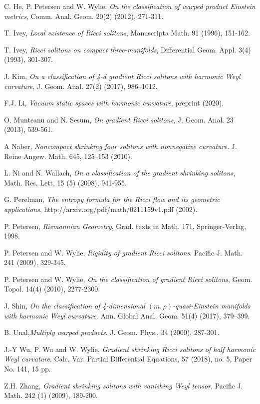 \documentclass{amsart}
\theoremstyle{definition}
\theoremstyle{remark}
\numberwithin{equation}{section}
\begin{document}
\begin{thebibliography}{30}
		 C. He, P. Petersen and W. Wylie, {\em On the classification of warped product Einstein metrics},
			Comm. Anal. Geom. 20(2) (2012), 271-311.
		
		 T. Ivey, {\em Local existence of Ricci solitons}, Manuscripta Math. 91 (1996), 151-162.
		
		 T. Ivey, {\em Ricci solitons on compact three-manifolds}, Differential Geom. Appl. 3(4) (1993), 301-307.
		
		 J. Kim, {\em On a classification of 4-d gradient Ricci solitons with harmonic Weyl curvature}, J. Geom. Anal. 27(2) (2017), 986–1012. 

        F.J. Li, {\em  Vacuum static spaces with harmonic curvature}, preprint (2020).

		 O. Munteanu and N. Sesum, {\em On gradient Ricci solitons}, J. Geom. Anal. 23 (2013), 539-561.

      A Naber, {\em Noncompact shrinking four solitons with nonnegative curvature}. J. Reine Angew. Math. 645, 125–153 (2010).  
		
		 L. Ni and N. Wallach, {\em On a classification of the gradient shrinking solitons}, Math. Res. Lett,
		15 (5) (2008), 941-955.
	
		 G. Perelman, {\em The entropy formula for the Ricci flow and its geometric applications}, http://arxiv.org/pdf/math/0211159v1.pdf  (2002).
		
		 P. Petersen, {\em Riemannian Geometry}, Grad. texts in Math. 171, Springer-Verlag, 1998.
		
		 P. Petersen and W. Wylie, {\em Rigidity of gradient Ricci solitons}. Pacific J. Math. 241 (2009), 329-345.
		
		  P. Petersen and W. Wylie, {\em On the classification of gradient Ricci solitons}, Geom. Topol. 14(4) (2010), 2277-2300.
				
	    J. Shin, {\em On the classification of 4-dimensional $(m,\rho)$-quasi-Einstein manifolds with harmonic Weyl curvature}. Ann. Global Anal. Geom. 51(4) (2017), 379–399.

B. \:Unal,{\em Multiply warped products}. J. Geom. Phys., 34 (2000), 287-301.

    J.-Y Wu, P. Wu and W. Wylie, {\em  Gradient shrinking Ricci solitons of half harmonic Weyl curvature}. Calc. Var. Partial Differential Equations, 57 (2018), no. 5, Paper No. 141, 15 pp.
		
		 Z.H. Zhang, {\em Gradient shrinking solitons with vanishing Weyl tensor}, Pacific J. Math. 242 (1) (2009), 189-200.
	\end{thebibliography}
\end{document}
